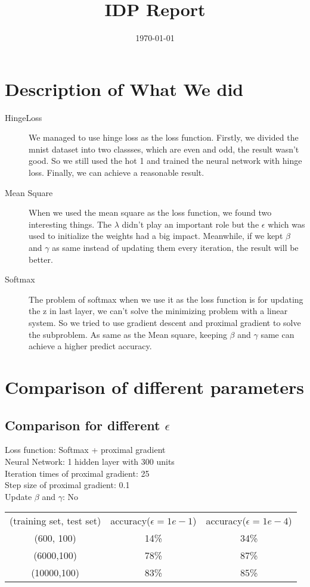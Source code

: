 \documentclass{article}
\title{IDP Report}
\date{\today}
\begin{document}
\maketitle

\section{Description of What We did}
\begin{description}
\item[HingeLoss]
We managed to use hinge loss as the loss function. Firstly, we divided the mnist dataset into two classses, which are even and odd, the result wasn't good. So we still used the hot 1 and trained the neural network with hinge loss. Finally, we can achieve a reasonable result.

\item[Mean Square]
When we used the mean square as the loss function, we found two interesting things. The $\lambda$ didn't play an important role but the $\epsilon$ which was used to initialize the weights had a big impact. Meanwhile, if we kept $\beta$ and $\gamma$ as same instead of updating them every iteration, the result will be better.

\item[Softmax]
The problem of softmax when we use it as the loss function is for updating the z in last layer, we can't solve the minimizing problem with a linear system. So we tried to use gradient descent and proximal gradient to solve the subproblem. As same as the Mean square, keeping $\beta$ and $\gamma$ same can achieve a higher predict accuracy. 

\end{description}

\section{Comparison of different parameters}
\subsection{Comparison for different $\epsilon$}
\begin{center}
Loss function: Softmax + proximal gradient\\
Neural Network: 1 hidden layer with 300 units\\
Iteration times of proximal gradient: 25 \\
Step size of proximal gradient: 0.1 \\
Update $\beta$ and $\gamma$:  No\\
	\begin{tabular}{c c c}
	\hline
		(training set, test set) & accuracy($\epsilon=1e-1$) & accuracy($\epsilon=1e-4$)\\
		(600, 100) & 14\% & 34\% \\
		(6000,100) & 78\% & 87\% \\
		(10000,100) & 83\% & 85\% \\
	\hline
	\end{tabular}
\end{center}
\end{document}
